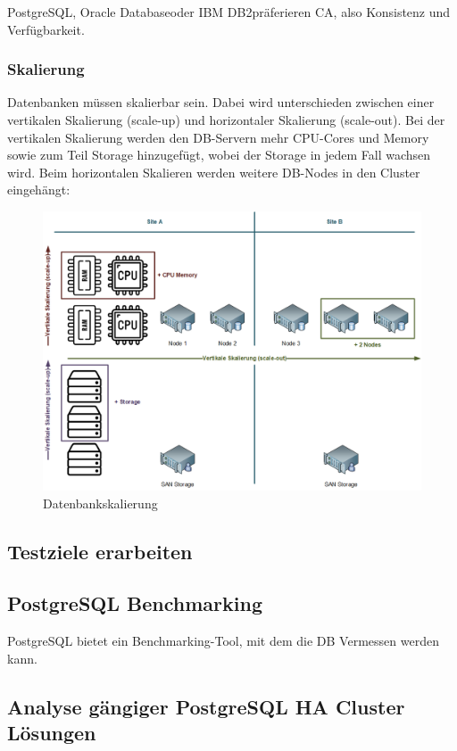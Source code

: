 \Gls{PostgreSQL}, \Gls{Oracle Database}oder \Gls{IBM DB2}präferieren CA, also Konsistenz und Verfügbarkeit.
\subsubsection{Skalierung}
Datenbanken müssen skalierbar sein.
Dabei wird unterschieden zwischen einer vertikalen Skalierung (scale-up) und horizontaler Skalierung (scale-out).
Bei der vertikalen Skalierung werden den DB-Servern mehr CPU-Cores und Memory sowie zum Teil Storage hinzugefügt, wobei der Storage in jedem Fall wachsen wird.
Beim horizontalen Skalieren werden weitere DB-Nodes in den Cluster eingehängt\cite{IZSGZLVT}:
\begin{figure}[H]
    \centering
    \includegraphics[width=1\linewidth]{source/implementation/evaluation/Skalierung}
    \caption{Datenbankskalierung}
    \label{fig:Datenbankskalierung}
\end{figure}

\subsection{Testziele erarbeiten}
\subsection{PostgreSQL Benchmarking}
PostgreSQL bietet ein Benchmarking-Tool,\cite{TYJFF7AB,VXNYQFTE} mit dem die DB Vermessen werden kann.
\subsection{Analyse gängiger PostgreSQL HA Cluster Lösungen}
